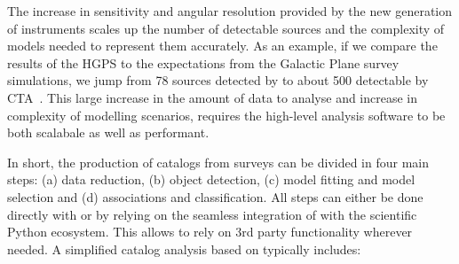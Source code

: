 \documentclass[longauth]{aa}
\begin{document}
The increase in sensitivity and angular resolution provided by the new generation of
instruments scales up the number of detectable sources and the complexity of 
models needed to represent them accurately. As an example, if we compare the
results of the HGPS to the expectations from the \cta Galactic Plane survey
simulations, we jump from 78 sources detected by \hess to about 500 detectable by
CTA~\citep{Remy2021}. This large increase in the amount of data to analyse
and increase in complexity of modelling scenarios, requires the high-level
analysis software to be both scalabale as well as performant. 

In short, the production of catalogs from \gammaray surveys can be divided in
four main steps: (a) data reduction, (b) object detection, (c) model fitting and model
selection and (d) associations and classification. All steps can either be done directly
with \gammapy or by relying on the seamless integration of \gammapy with the
scientific Python ecosystem. This allows to rely on 3rd party functionality
wherever needed. A simplified catalog analysis based on \gammapy typically includes:
\end{document}
